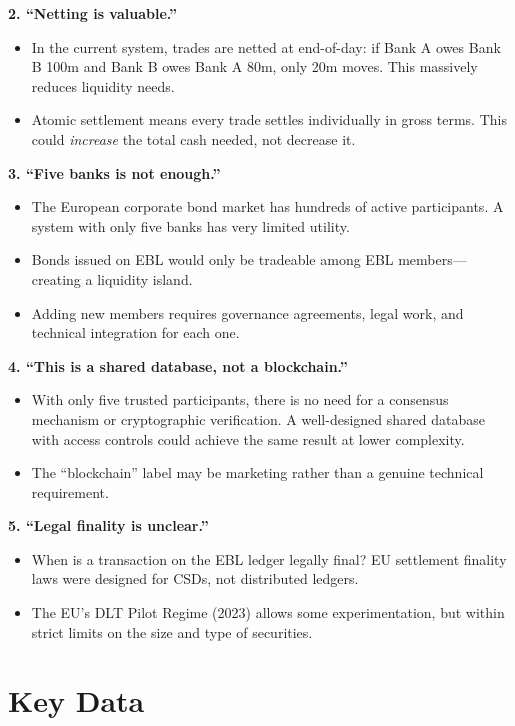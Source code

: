 \documentclass[11pt]{article}
\begin{document}
\medskip
\noindent\textbf{2. ``Netting is valuable.''}
\begin{itemize}[leftmargin=*]
\item In the current system, trades are netted at end-of-day: if Bank A owes Bank B \texteuro 100m and Bank B owes Bank A \texteuro 80m, only \texteuro 20m moves. This massively reduces liquidity needs.
\item Atomic settlement means every trade settles individually in gross terms. This could \textit{increase} the total cash needed, not decrease it.
\end{itemize}

\medskip
\noindent\textbf{3. ``Five banks is not enough.''}
\begin{itemize}[leftmargin=*]
\item The European corporate bond market has hundreds of active participants. A system with only five banks has very limited utility.
\item Bonds issued on EBL would only be tradeable among EBL members---creating a liquidity island.
\item Adding new members requires governance agreements, legal work, and technical integration for each one.
\end{itemize}

\medskip
\noindent\textbf{4. ``This is a shared database, not a blockchain.''}
\begin{itemize}[leftmargin=*]
\item With only five trusted participants, there is no need for a consensus mechanism or cryptographic verification. A well-designed shared database with access controls could achieve the same result at lower complexity.
\item The ``blockchain'' label may be marketing rather than a genuine technical requirement.
\end{itemize}

\medskip
\noindent\textbf{5. ``Legal finality is unclear.''}
\begin{itemize}[leftmargin=*]
\item When is a transaction on the EBL ledger legally final? EU settlement finality laws were designed for CSDs, not distributed ledgers.
\item The EU's DLT Pilot Regime (2023) allows some experimentation, but within strict limits on the size and type of securities.
\end{itemize}

\section*{Key Data}
\end{document}
